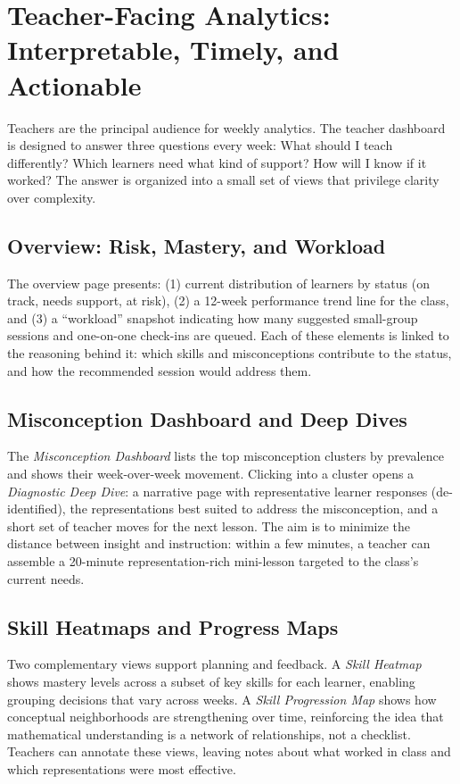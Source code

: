 \section{Teacher-Facing Analytics: Interpretable, Timely, and Actionable}

Teachers are the principal audience for weekly analytics. The teacher dashboard is designed to answer three questions every week: What should I teach differently? Which learners need what kind of support? How will I know if it worked? The answer is organized into a small set of views that privilege clarity over complexity.

\subsection{Overview: Risk, Mastery, and Workload}

The overview page presents: (1) current distribution of learners by status (on track, needs support, at risk), (2) a 12-week performance trend line for the class, and (3) a ``workload'' snapshot indicating how many suggested small-group sessions and one-on-one check-ins are queued. Each of these elements is linked to the reasoning behind it: which skills and misconceptions contribute to the status, and how the recommended session would address them.

\subsection{Misconception Dashboard and Deep Dives}

The \emph{Misconception Dashboard} lists the top misconception clusters by prevalence and shows their week-over-week movement. Clicking into a cluster opens a \emph{Diagnostic Deep Dive}: a narrative page with representative learner responses (de-identified), the representations best suited to address the misconception, and a short set of teacher moves for the next lesson. The aim is to minimize the distance between insight and instruction: within a few minutes, a teacher can assemble a 20-minute representation-rich mini-lesson targeted to the class's current needs.

\subsection{Skill Heatmaps and Progress Maps}

Two complementary views support planning and feedback. A \emph{Skill Heatmap} shows mastery levels across a subset of key skills for each learner, enabling grouping decisions that vary across weeks. A \emph{Skill Progression Map} shows how conceptual neighborhoods are strengthening over time, reinforcing the idea that mathematical understanding is a network of relationships, not a checklist. Teachers can annotate these views, leaving notes about what worked in class and which representations were most effective.

